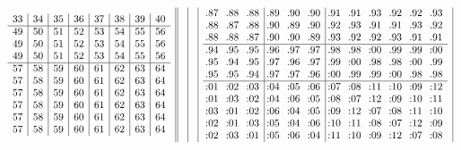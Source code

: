\documentclass[11pt,a4paper]{amsart}
\begin{document}
\begin{align*}
\begin{array}{r||c|c|c|c|c}
\begin{array}{c|c|c|c|c|c|c|c}
33&34&35&36&37&38&39&40\\\hline
49&50&51&52&53&54&55&56\\
49&50&51&52&53&54&55&56\\
49&50&51&52&53&54&55&56\\\hline
57&58&59&60&61&62&63&64\\
57&58&59&60&61&62&63&64\\
57&58&59&60&61&62&63&64\\
57&58&59&60&61&62&63&64\\
57&58&59&60&61&62&63&64\\
57&58&59&60&61&62&63&64\\
  \end{array}
&&&
  \begin{array}{ccc|ccc|cccccc}
    \llap.87 & \llap.88 & \llap.88 & \llap.89 & \llap.90 & \llap.90 & \llap.91 & \llap.91 & \llap.93 & \llap.92 & \llap.92 & \llap.93 \\
    \llap.88 & \llap.87 & \llap.88 & \llap.90 & \llap.89 & \llap.90 & \llap.92 & \llap.93 & \llap.91 & \llap.91 & \llap.93 & \llap.92 \\
    \llap.88 & \llap.88 & \llap.87 & \llap.90 & \llap.90 & \llap.89 & \llap.93 & \llap.92 & \llap.92 & \llap.93 & \llap.91 & \llap.91 \\
\hline
    \llap.94 & \llap.95 & \llap.95 & \llap.96 & \llap.97 & \llap.97 & \llap.98 & \llap.98 & \llap:00 & \llap.99 & \llap.99 & \llap:00 \\
    \llap.95 & \llap.94 & \llap.95 & \llap.97 & \llap.96 & \llap.97 & \llap.99 & \llap:00 & \llap.98 & \llap.98 & \llap:00 & \llap.99 \\
    \llap.95 & \llap.95 & \llap.94 & \llap.97 & \llap.97 & \llap.96 & \llap:00 & \llap.99 & \llap.99 & \llap:00 & \llap.98 & \llap.98 \\
\hline
    \llap:01 & \llap:02 & \llap:03 & \llap:04 & \llap:05 & \llap:06 & \llap:07 & \llap:08 & \llap:11 & \llap:10 & \llap:09 & \llap:12 \\
    \llap:01 & \llap:03 & \llap:02 & \llap:04 & \llap:06 & \llap:05 & \llap:08 & \llap:07 & \llap:12 & \llap:09 & \llap:10 & \llap:11 \\
    \llap:03 & \llap:01 & \llap:02 & \llap:06 & \llap:04 & \llap:05 & \llap:09 & \llap:12 & \llap:07 & \llap:08 & \llap:11 & \llap:10 \\
    \llap:02 & \llap:01 & \llap:03 & \llap:05 & \llap:04 & \llap:06 & \llap:10 & \llap:11 & \llap:08 & \llap:07 & \llap:12 & \llap:09 \\
    \llap:02 & \llap:03 & \llap:01 & \llap:05 & \llap:06 & \llap:04 & \llap:11 & \llap:10 & \llap:09 & \llap:12 & \llap:07 & \llap:08 \\

\end{array}
\end{array}
\end{align*}
\end{document}
